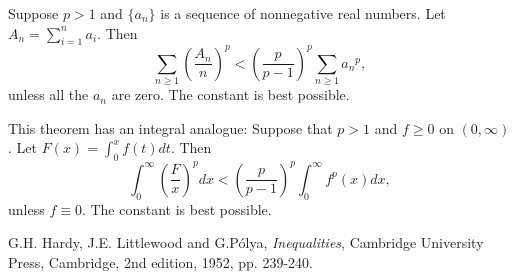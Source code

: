 \documentclass[12pt]{article}
\begin{document}
Suppose $p>1$ and $\{a_n\}$ is a sequence of nonnegative real numbers.
Let $A_n = \sum_{i=1}^n a_i$. Then
$$
\sum_{n \ge 1}\left ( \frac{A_n}{n}\right )^p < \left ( \frac{p}{p-1} \right ) ^p \sum_{n \ge 1} {a_n}^p,
$$
unless all the $a_n$ are zero. The constant is best possible.

This theorem has an integral analogue:
Suppose that $p > 1$ and $f \ge 0$ on $(0, \infty)$. 
Let $F(x) = \int_0^x f(t)dt$. Then
$$
\int_0^{\infty} \left ( \frac{F}{x} \right)^p dx < \left ( \frac{p}{p-1} \right )^p \int_0^{\infty} f^p(x)dx,
$$ 
unless $f \equiv 0$. The constant is best possible.


\begin{thebibliography}{99}
\item 
G.H. Hardy, J.E. Littlewood and G.P{\'o}lya, \emph{Inequalities}, Cambridge University Press,
Cambridge, 2nd edition, 1952, pp. 239-240.
\end{thebibliography}
\end{document}
